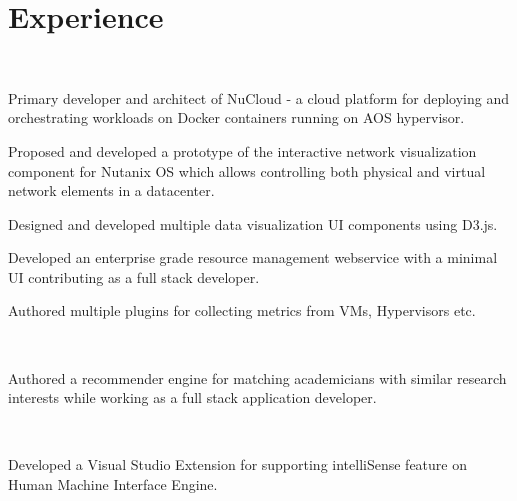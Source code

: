 \documentclass[]{deedy-resume-openfont}
\begin{document}
\begin{minipage}[t]{0.66\textwidth}


	\section{Experience}

	\\
	\vspace{\topsep} %
	\begin{tightemize}
		\item Primary developer and architect of NuCloud - a cloud platform for deploying and orchestrating workloads on Docker containers running on AOS hypervisor.
		\item Proposed and developed a prototype of the interactive network visualization component for Nutanix OS which allows controlling both physical and virtual network elements in a datacenter.
		\item Designed and developed multiple data visualization UI components using D3.js.
	\end{tightemize}
	\begin{tightemize}
		\item Developed an enterprise grade resource management webservice with a minimal UI contributing as a full stack developer.
		\item Authored multiple plugins for collecting metrics from VMs, Hypervisors etc.
	\end{tightemize}

	\sectionsep

	\\
	\begin{tightemize}
		\item Authored a recommender engine for matching academicians with similar research interests while working as a full stack application developer.
	\end{tightemize}
	\sectionsep

	\\
	\begin{tightemize}
		\item Developed a Visual Studio Extension for supporting intelliSense feature on Human Machine Interface Engine.
	\end{tightemize}
	\sectionsep


\end{minipage}
\end{document}
